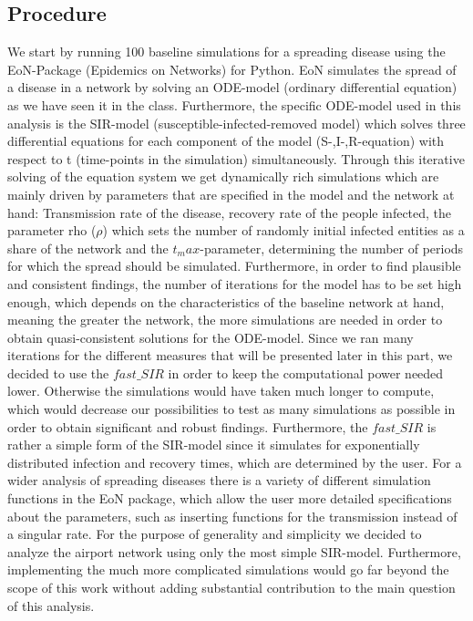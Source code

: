 \documentclass{Resources/netsci-project}
\begin{document}
\subsection{Procedure}
We start by running 100 baseline simulations for a spreading disease using the EoN-Package (Epidemics on Networks) for Python. EoN simulates the spread of a disease in a network by solving an ODE-model (ordinary differential equation) as we have seen it in the class. Furthermore, the specific ODE-model used in this analysis is the SIR-model (susceptible-infected-removed model) which solves three differential equations for each component of the model (S-,I-,R-equation) with respect to t (time-points in the simulation) simultaneously. Through this iterative solving of the equation system we get dynamically rich simulations which are mainly driven by parameters that are specified in the model and the network at hand: Transmission rate of the disease, recovery rate of the people infected, the parameter rho ($\rho$) which sets the number of randomly initial infected entities as a share of the network and the 
$t_max$-parameter, determining the number of periods for which the spread should be simulated. Furthermore, in order to find plausible and consistent findings, the number of iterations for the model has to be set high enough, which depends on the characteristics of the baseline network at hand, meaning the greater the network, the more simulations are needed in order to obtain quasi-consistent solutions for the ODE-model. Since we ran many iterations for the different measures that will be presented later in this part, we decided to use the $fast\_SIR$ in order to keep the computational power needed lower. Otherwise the simulations would have taken much longer to compute, which would decrease our possibilities to test as many simulations as possible in order to obtain significant and robust findings. Furthermore, the $fast\_SIR$ is rather a simple form of the SIR-model since it simulates for exponentially distributed infection and recovery times, which are determined by the user. For a wider analysis of spreading diseases there is a variety of different simulation functions in the EoN package, which allow the user more detailed specifications about the parameters, such as inserting functions for the transmission instead of a singular rate. For the purpose of generality and simplicity we decided to analyze the airport network using only the most simple SIR-model. Furthermore, implementing the much more complicated simulations would go far beyond the scope of this work without adding substantial contribution to the main question of this analysis.  
\end{document}
